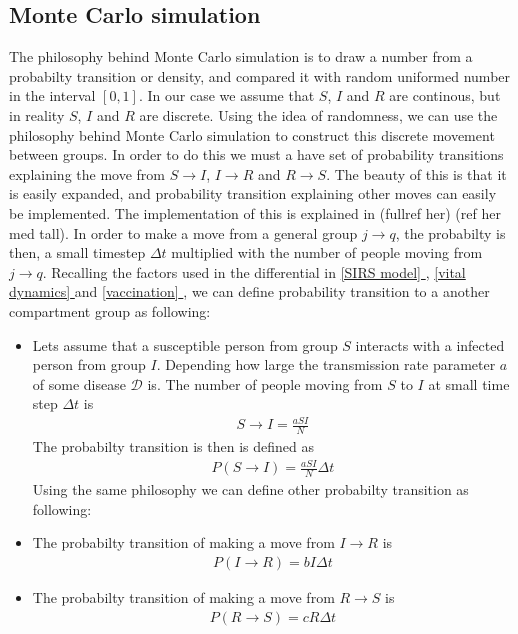 \documentclass[a4paper, 10pt]{article}
\newcommand*{\fullref}[1]{\hyperref[{#1}]{\autoref*{#1} \nameref*{#1}}}
\begin{document}
  \subsection{Monte Carlo simulation}
  The philosophy behind Monte Carlo simulation is to draw a number from a probabilty transition
  or density, and compared it with random uniformed number in the interval $[0,1]$. In our case
  we assume that $S$, $I$ and $R$ are continous, but in reality $S$, $I$ and $R$ are discrete. Using the idea of
  randomness, we can use the philosophy behind Monte Carlo simulation to construct this discrete movement between groups.
  In order to do this we must a have set of probability transitions explaining the move
  from $S \to I$, $I\to R$ and $R \to S$. The beauty of this is that it is easily expanded, and
  probability transition explaining other moves can easily be implemented. The implementation of this
  is explained in (fullref her) (ref her med tall).
 In order to make a move from a general group $j \to q$, the
  probabilty is then, a small timestep $\Delta t$ multiplied with the number of people moving from $j \to q$.
  Recalling the factors used in the differential in \fullref{SIRS model},
  \fullref{vital dynamics} and \fullref{vaccination},
   we can define probability transition to a another compartment group as following:
   \begin{itemize}
     \item Lets assume that a susceptible person from group $S$
     interacts with a infected person from group $I$. Depending how large the transmission
     rate parameter $a$ of some disease $\mathcal{D}$ is. The number of people
     moving from $S$ to $I$ at small time step $\Delta t$ is
     \begin{align}
       S\to I = \frac{aSI}{N}
     \end{align}
      The probabilty transition is then
     is defined as
     \begin{align}
       P(S \rightarrow I) = \frac{aSI}{N} \Delta t
     \end{align}
     Using the same philosophy we can define other probabilty transition as following:
     \item The probabilty transition of making a move from $I \to R$ is
     \begin{align}
         P(I \rightarrow R) = bI \Delta t
     \end{align}
      \item The probabilty transition of making a move from $R \to S$ is
      \begin{align}
        P(R \rightarrow S) = cR \Delta t
      \end{align}
   \end{itemize}
\end{document}
